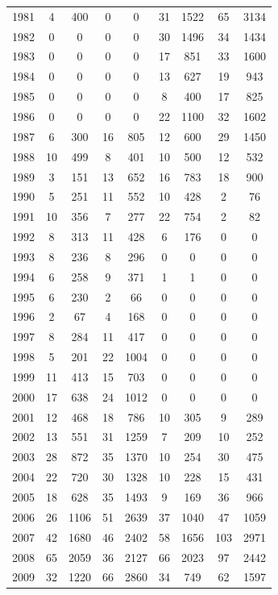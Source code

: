 \documentclass[12pt,]{article}
\begin{document}
\begin{longtable}{ccccccccc}
  1981 & 4 & 400 & 0 & 0 & 31 & 1522 & 65 & 3134 \\ 
  1982 & 0 & 0 & 0 & 0 & 30 & 1496 & 34 & 1434 \\ 
  1983 & 0 & 0 & 0 & 0 & 17 & 851 & 33 & 1600 \\ 
  1984 & 0 & 0 & 0 & 0 & 13 & 627 & 19 & 943 \\ 
  1985 & 0 & 0 & 0 & 0 & 8 & 400 & 17 & 825 \\ 
  1986 & 0 & 0 & 0 & 0 & 22 & 1100 & 32 & 1602 \\ 
  1987 & 6 & 300 & 16 & 805 & 12 & 600 & 29 & 1450 \\ 
  1988 & 10 & 499 & 8 & 401 & 10 & 500 & 12 & 532 \\ 
  1989 & 3 & 151 & 13 & 652 & 16 & 783 & 18 & 900 \\ 
  1990 & 5 & 251 & 11 & 552 & 10 & 428 & 2 & 76 \\ 
  1991 & 10 & 356 & 7 & 277 & 22 & 754 & 2 & 82 \\ 
  1992 & 8 & 313 & 11 & 428 & 6 & 176 & 0 & 0 \\ 
  1993 & 8 & 236 & 8 & 296 & 0 & 0 & 0 & 0 \\ 
  1994 & 6 & 258 & 9 & 371 & 1 & 1 & 0 & 0 \\ 
  1995 & 6 & 230 & 2 & 66 & 0 & 0 & 0 & 0 \\ 
  1996 & 2 & 67 & 4 & 168 & 0 & 0 & 0 & 0 \\ 
  1997 & 8 & 284 & 11 & 417 & 0 & 0 & 0 & 0 \\ 
  1998 & 5 & 201 & 22 & 1004 & 0 & 0 & 0 & 0 \\ 
  1999 & 11 & 413 & 15 & 703 & 0 & 0 & 0 & 0 \\ 
  2000 & 17 & 638 & 24 & 1012 & 0 & 0 & 0 & 0 \\ 
  2001 & 12 & 468 & 18 & 786 & 10 & 305 & 9 & 289 \\ 
  2002 & 13 & 551 & 31 & 1259 & 7 & 209 & 10 & 252 \\ 
  2003 & 28 & 872 & 35 & 1370 & 10 & 254 & 30 & 475 \\ 
  2004 & 22 & 720 & 30 & 1328 & 10 & 228 & 15 & 431 \\ 
  2005 & 18 & 628 & 35 & 1493 & 9 & 169 & 36 & 966 \\ 
  2006 & 26 & 1106 & 51 & 2639 & 37 & 1040 & 47 & 1059 \\ 
  2007 & 42 & 1680 & 46 & 2402 & 58 & 1656 & 103 & 2971 \\ 
  2008 & 65 & 2059 & 36 & 2127 & 66 & 2023 & 97 & 2442 \\ 
  2009 & 32 & 1220 & 66 & 2860 & 34 & 749 & 62 & 1597 \\ 

\end{longtable}
\end{document}
